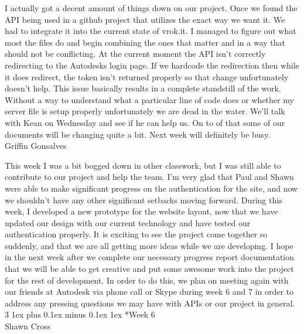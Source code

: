 \documentclass[letterpaper, 10pt, draftclsnofoot, compsoc, onecolumn]{IEEEtran}
\makeatletter
\def\subsubsection{\@startsection{subsubsection}%
                                 {3}%
                                 {\z@}%
                                 {1ex plus 0.1ex minus 0.1ex}%
                                 {1ex}%
                                 {\normalfont\normalsize}}%
\makeatother
\begin{document}
I actually got a decent amount of things down on our project. Once we found the API being used in a github project that utilizes the exact way we want it. We had to integrate it into the current state of vrok.it. I managed to figure out what most the files do and begin combining the ones that matter and in a way that should not be conflicting. At the current moment the API isn't correctly redirecting to the Autodesks login page. If we hardcode the redirection then while it does redirect, the token isn't returned properly so that change unfortunately doesn't help. This issue basically results in a complete standstill of the work. Without a way to understand what a particular line of code does or whether my server file is setup properly unfortunately we are dead in the water. We'll talk with Kean on Wednesday and see if he can help us. On to of that some of our documents will be changing quite a bit. Next week will definitely be busy.\\

Griffin Gonsalves

This week I was a bit bogged down in other classwork, but I was still able to contribute to our project and help the team. I'm very glad that Paul and Shawn were able to make significant progress on the authentication for the site, and now we shouldn't have any other significant setbacks moving forward. During this week, I developed a new prototype for the website layout, now that we have updated our design with our current technology and have tested our authentication properly. It is exciting to see the project come together so suddenly, and that we are all getting more ideas while we are developing. I hope in the next week after we complete our necessary progress report documentation that we will be able to get creative and put some awesome work into the project for the rest of development. In order to do this, we plan on meeting again with our friends at Autodesk via phone call or Skype during week 6 and 7 in order to address any pressing questions we may have with APIs or our project in general.\\

\subsubsection*{Week 6}\hspace*{\fill} \\
Shawn Cross
\end{document}
